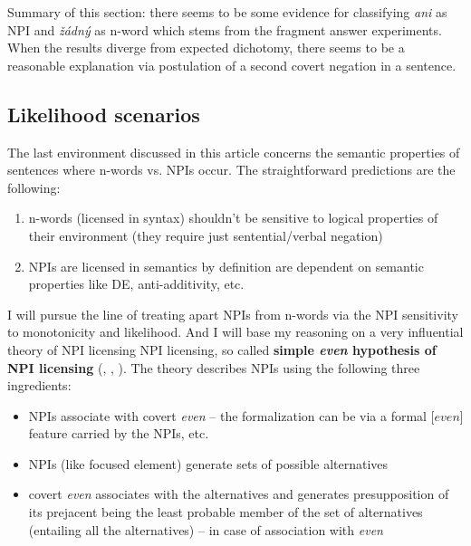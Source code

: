 \documentclass[12pt]{scrartcl}
\providecommand{\tightlist}{%
  \setlength{\itemsep}{0pt}\setlength{\parskip}{0pt}}
\begin{document}
Summary of this section: there seems to be some evidence for classifying \textit{ani} as NPI and \textit{žádný} as n-word which stems from the fragment answer experiments. When the results diverge from expected dichotomy, there seems to be a reasonable explanation via postulation of a second covert negation in a sentence.

\hypertarget{likelihood-scenarios}{%
\subsection{Likelihood scenarios}\label{likelihood-scenarios}}

The last environment discussed in this article concerns the semantic properties of sentences where n-words vs. NPIs occur. The straightforward predictions are the following:

\begin{enumerate}
  \def\labelenumi{\arabic{enumi})}
  \tightlist
  \item
    n-words (licensed in syntax) shouldn't be sensitive to logical properties of
    their environment (they require just sentential/verbal negation)
  \item
    NPIs are licensed in semantics by definition are dependent on semantic properties like DE, anti-additivity, etc.
\end{enumerate}

I will pursue the line of treating apart NPIs from n-words via the NPI sensitivity to monotonicity and likelihood. And I will base my reasoning on a very influential theory of NPI licensing NPI licensing, so called \textbf{simple
  \emph{even} hypothesis of NPI licensing} (\citealt{heim1984note},  \citealt{krifka1995semantics}, \citealt{crnivc2014against}). The theory describes NPIs using the following three ingredients:

  \begin{itemize}
  \tightlist
  \item
    NPIs associate with covert \emph{even} -- the formalization can be via a formal [$even$] feature carried by the NPIs, etc.
  \item
    NPIs (like focused element) generate sets of possible alternatives
  \item
    covert \emph{even} associates with the alternatives and generates
    presupposition of its prejacent being the least probable member of
    the set of alternatives (entailing all the alternatives) -- in case of association with \textit{even}
  \end{itemize}
\end{document}
